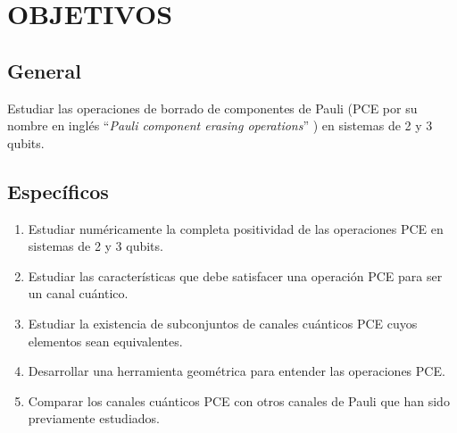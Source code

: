 \chapter{OBJETIVOS}

\section*{General}
Estudiar las operaciones de borrado de componentes de Pauli (PCE por
su nombre en inglés ``\textit{Pauli component erasing operations}'' 
) en sistemas de 2 y 3 qubits.


\section*{Específicos}
\begin{enumerate}
\item Estudiar numéricamente la completa positividad de las operaciones 
PCE en sistemas de 2 y 3 qubits.

\item Estudiar las características que debe satisfacer una operación PCE
para ser un canal cuántico.

\item Estudiar la existencia de subconjuntos de canales cuánticos PCE
cuyos elementos sean equivalentes.

\item Desarrollar una herramienta geométrica para entender las
operaciones PCE.

\item Comparar los canales cuánticos PCE con otros canales de Pauli que han 
sido previamente estudiados.
\end{enumerate}


